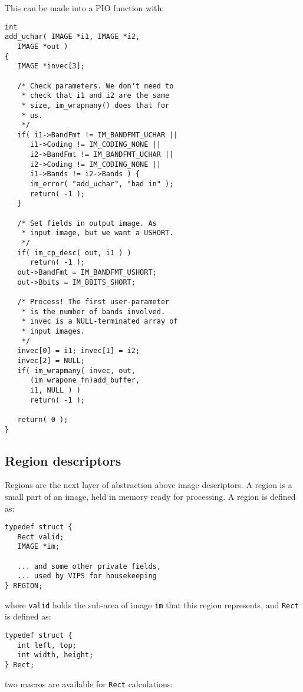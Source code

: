 This can be made into a PIO function with:

\begin{verbatim}
int
add_uchar( IMAGE *i1, IMAGE *i2, 
   IMAGE *out )
{
   IMAGE *invec[3];

   /* Check parameters. We don't need to 
    * check that i1 and i2 are the same 
    * size, im_wrapmany() does that for 
    * us.
    */
   if( i1->BandFmt != IM_BANDFMT_UCHAR ||
      i1->Coding != IM_CODING_NONE ||
      i2->BandFmt != IM_BANDFMT_UCHAR || 
      i2->Coding != IM_CODING_NONE ||
      i1->Bands != i2->Bands ) {
      im_error( "add_uchar", "bad in" );
      return( -1 );
   }

   /* Set fields in output image. As 
    * input image, but we want a USHORT.
    */
   if( im_cp_desc( out, i1 ) )
      return( -1 );
   out->BandFmt = IM_BANDFMT_USHORT;
   out->Bbits = IM_BBITS_SHORT;

   /* Process! The first user-parameter 
    * is the number of bands involved. 
    * invec is a NULL-terminated array of 
    * input images.
    */
   invec[0] = i1; invec[1] = i2; 
   invec[2] = NULL;
   if( im_wrapmany( invec, out,
      (im_wrapone_fn)add_buffer, 
      i1, NULL ) )
      return( -1 );

   return( 0 );
}
\end{verbatim}

\subsection{Region descriptors}

Regions are the next layer of abstraction above image descriptors. A region
is a small part of an image, held in memory ready for processing. A region
is defined as:

\begin{verbatim}
typedef struct {
   Rect valid;   
   IMAGE *im;

   ... and some other private fields, 
   ... used by VIPS for housekeeping
} REGION; 
\end{verbatim}

\noindent
where \verb+valid+ holds the sub-area of image \verb+im+ that this region
represents, and \verb+Rect+ is defined as:

\begin{verbatim}
typedef struct {
   int left, top;
   int width, height;
} Rect; 
\end{verbatim}

\noindent
two macros are available for \verb+Rect+ calculations:

